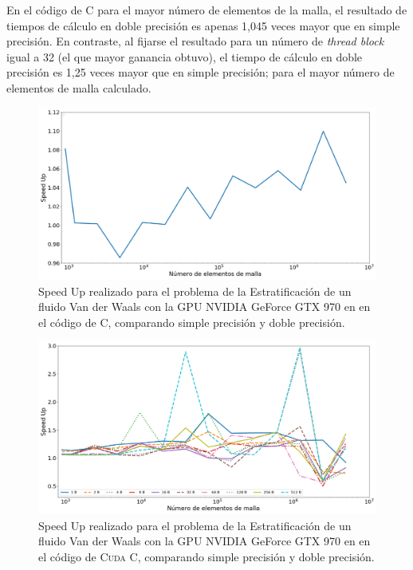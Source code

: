 En el código de \textsc{C} para el mayor número de elementos de la malla, el resultado de tiempos de cálculo en doble precisión es apenas 1,045 veces mayor que en  simple precisión. En contraste, al fijarse el resultado para un número de \textit{thread block} igual a 32 (el que mayor ganancia obtuvo), el tiempo de cálculo en doble precisión es 1,25 veces mayor que en simple precisión; para el mayor número de elementos de malla calculado.

\begin{figure}[h!]
	\centering
	\includegraphics[width=\textwidth]{figs/cap4/c_970_VdW_c_10}
	\caption{Speed Up realizado para el problema de la Estratificación de un fluido Van der Waals con la GPU NVIDIA GeForce GTX 970 en en el código de \textsc{C}, comparando simple precisión y doble precisión.} 
	\label{fig:c_970_VdW_c_10}	
\end{figure}

\begin{figure}[h!]
	\centering
	\includegraphics[width=\textwidth]{figs/cap4/c_970_VdW_cuda_10}
	\caption{Speed Up realizado para el problema de la Estratificación de un fluido Van der Waals con la GPU NVIDIA GeForce GTX 970 en en el código de \textsc{Cuda C}, comparando simple precisión y doble precisión.} 
	\label{fig:c_970_VdW_cuda_10}	
\end{figure}

